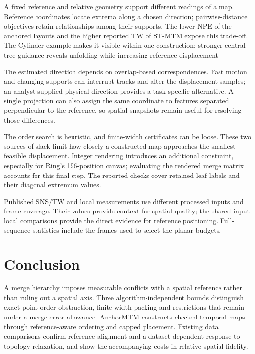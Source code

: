 \documentclass[review]{vgtc}
\begin{document}
A fixed reference and relative geometry support different readings of a map. Reference coordinates locate extrema along a chosen direction; pairwise-distance objectives retain relationships among their supports. The lower NPE of the anchored layouts and the higher reported TW of ST-MTM expose this trade-off. The Cylinder example makes it visible within one construction: stronger central-tree guidance reveals unfolding while increasing reference displacement.

The estimated direction depends on overlap-based correspondences. Fast motion and changing supports can interrupt tracks and alter the displacement samples; an analyst-supplied physical direction provides a task-specific alternative. A single projection can also assign the same coordinate to features separated perpendicular to the reference, so spatial snapshots remain useful for resolving those differences.

The order search is heuristic, and finite-width certificates can be loose. These two sources of slack limit how closely a constructed map approaches the smallest feasible displacement. Integer rendering introduces an additional constraint, especially for Ring's 196-position canvas; evaluating the rendered merge matrix accounts for this final step. The reported checks cover retained leaf labels and their diagonal extremum values.

Published SNS/TW and local measurements use different processed inputs and frame coverage. Their values provide context for spatial quality; the shared-input local comparisons provide the direct evidence for reference positioning. Full-sequence statistics include the frames used to select the planar budgets.

\section{Conclusion}
A merge hierarchy imposes measurable conflicts with a spatial reference rather than ruling out a spatial axis. Three algorithm-independent bounds distinguish exact point-order obstruction, finite-width packing and restrictions that remain under a merge-error allowance. AnchorMTM constructs checked temporal maps through reference-aware ordering and capped placement. Existing data comparisons confirm reference alignment and a dataset-dependent response to topology relaxation, and show the accompanying costs in relative spatial fidelity.
\FloatBarrier
\begingroup
{}


\endgroup
\end{document}
